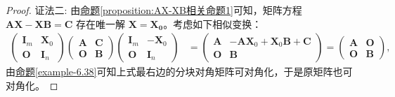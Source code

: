 \documentclass[../../main.tex]{subfiles}
\begin{document}
\begin{proof}
{\color{blue}证法二:}
由\hyperref[proposition:AX-XB相关命题1]{命题\ref{proposition:AX-XB相关命题1}}可知，矩阵方程 \(\boldsymbol{AX - XB = C}\) 存在唯一解 \(\boldsymbol{X = X_0}\)。考虑如下相似变换：
\begin{align*}
\begin{pmatrix}
\boldsymbol{I}_m & \boldsymbol{X}_0 \\
\boldsymbol{O} & \boldsymbol{I}_n
\end{pmatrix}
\begin{pmatrix}
\boldsymbol{A} & \boldsymbol{C} \\
\boldsymbol{O} & \boldsymbol{B}
\end{pmatrix}
\begin{pmatrix}
\boldsymbol{I}_m & -\boldsymbol{X}_0 \\
\boldsymbol{O} & \boldsymbol{I}_n
\end{pmatrix}
&=
\begin{pmatrix}
\boldsymbol{A} & -\boldsymbol{AX}_0 + \boldsymbol{X}_0\boldsymbol{B} + \boldsymbol{C} \\
\boldsymbol{O} & \boldsymbol{B}
\end{pmatrix}
=
\begin{pmatrix}
\boldsymbol{A} & \boldsymbol{O} \\
\boldsymbol{O} & \boldsymbol{B}
\end{pmatrix},
\end{align*}
由\hyperref[example-6.38]{命题\ref{example-6.38}}可知上式最右边的分块对角矩阵可对角化，于是原矩阵也可对角化。
\end{proof}
\end{document}
